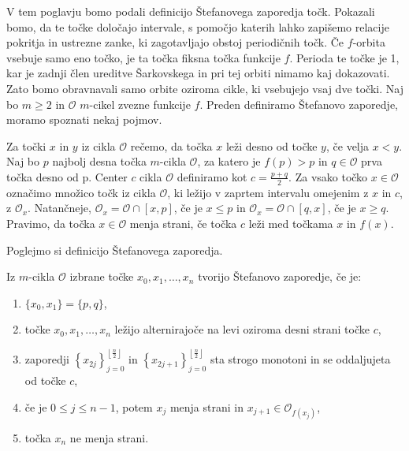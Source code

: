 \documentclass[../TG_magistrsko_delo_sections.tex]{subfiles}
\begin{document}
V tem poglavju bomo podali definicijo Štefanovega zaporedja točk. Pokazali bomo, da te točke določajo intervale, s pomočjo katerih lahko zapišemo relacije pokritja in ustrezne zanke, ki zagotavljajo obstoj periodičnih točk. 
Če $f$-orbita vsebuje samo eno točko, je ta točka fiksna točka funkcije $f$. Perioda te točke je 1, kar je zadnji člen ureditve Šarkovskega in pri tej orbiti nimamo kaj dokazovati. Zato bomo obravnavali samo orbite oziroma cikle, ki vsebujejo vsaj dve točki. Naj bo $m \geq 2$ in $\mathcal{O}$ $m$-cikel zvezne funkcije $f$. Preden definiramo Štefanovo zaporedje, moramo spoznati nekaj pojmov. 

\begin{definicija}
Za točki $x$ in $y$ iz cikla $\mathcal{O}$  rečemo, da točka $x$ leži desno od točke $y$, če velja $x < y$. Naj bo $p$ najbolj desna točka $m$-cikla $\mathcal{O}$, za katero je $f(p) > p$ in $q\in \mathcal{O}$ prva točka desno od p. Center $c$ cikla $\mathcal{O}$ definiramo kot $c=\frac{p+q}{2}$. Za vsako točko $x \in \mathcal{O}$ označimo množico točk iz cikla $\mathcal{O}$, ki ležijo v zaprtem intervalu omejenim z $x$ in $c$, z $\mathcal{O}_x$. Natančneje, $\mathcal{O}_x = \mathcal{O} \cap [x, p]$, če je $x \leq p$ in  $\mathcal{O}_x = \mathcal{O} \cap [q, x]$, če je $x \geq q$. Pravimo, da točka $x \in \mathcal{O}$ menja strani, če točka $c$ leži med točkama $x$ in $f(x)$.
\end{definicija}
Poglejmo si definicijo Štefanovega zaporedja.

\begin{definicija}\label{def:stef}
Iz $m$-cikla $\mathcal{O}$ izbrane točke $x_0, x_1, \dots, x_n$ tvorijo Štefanovo zaporedje, če je:

\begin{enumerate}[label={(Š\arabic*)}]\label{def:stef-zap}
    \item $\{x_0, x_1\} = \{p, q\}$, \label{eq:š1}
    \item točke $x_0, x_1, \dots, x_n$ ležijo alternirajoče na levi oziroma desni strani točke $c$, \label{eq:š2}
    \item zaporedji 
    $\left \{ x_{2j} \right \}_{j=0}^{\left \lfloor \frac{n}{2} \right \rfloor}$ 
    in
    $\left \{ x_{2j+1} \right \}_{j=0}^{\left \lfloor \frac{n}{2} \right \rfloor}$ sta strogo monotoni in se oddaljujeta od točke $c$, \label{eq:š3}
    \item če je $0\leq j \leq n-1$, potem $x_j$ menja strani in $x_{j+1} \in \mathcal{O}_{f(x_j)}$,\label{eq:š4}
    \item točka $x_n$ ne menja strani. \label{eq:š5}
\end{enumerate}
\end{definicija}
\end{document}
